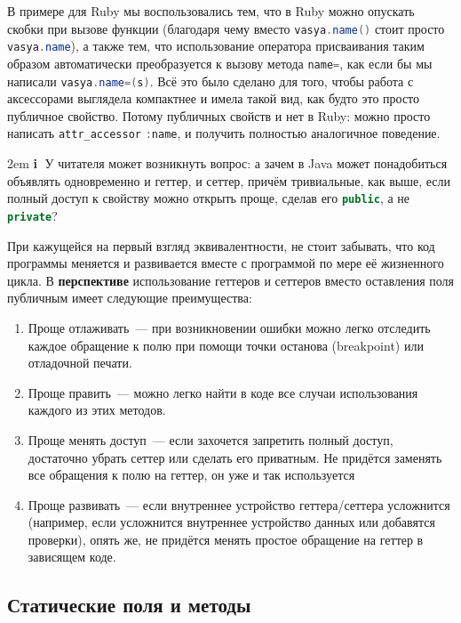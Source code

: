 \documentclass[a4paper, 14pt, titlepage]{extarticle}
\newcommand{\strong}[1]{\textbf{#1}}
\newenvironment{indented}%
    { \begingroup %
        \noindent %
        \leftskip2em %
        \rightskip\leftskip }%
    { \par\endgroup }
\newenvironment{extrainfo}%
    { \begin{indented} %
        \small %
        \textbf{\textcircled{\footnotesize i}} }%
    { \end{indented} }
\newcommand{\inlinecode}[2][Java]{\lstinline[basicstyle=\ttfamily, language=#1]{#2}}
\begin{document}
  В примере для Ruby мы воспользовались тем, что в Ruby можно опускать скобки при вызове функции
  (благодаря чему вместо \inlinecode{vasya.name()} стоит просто \inlinecode{vasya.name}), а также
  тем, что использование оператора присваивания таким образом автоматически преобразуется к вызову
  метода \inlinecode{name=}, как если бы мы написали \inlinecode{vasya.name=(s)}. Всё это было
  сделано для того, чтобы работа с аксессорами выглядела компактнее и имела такой вид, как будто это
  просто публичное свойство. Потому публичных свойств и нет в Ruby: можно просто написать
  \inlinecode{attr_accessor} \mbox{\inlinecode{:name}}, и получить полностью аналогичное поведение.

  \begin{extrainfo}
    У читателя может возникнуть вопрос: а зачем в Java может понадобиться объявлять одновременно и
    геттер, и сеттер, причём тривиальные, как выше, если полный доступ к свойству можно открыть проще,
    сделав его \inlinecode{public}, а не \inlinecode{private}?

    При кажущейся на первый взгляд эквивалентности, не стоит забывать, что код программы меняется и
    развивается вместе с программой по мере её жизненного цикла. В \strong{перспективе}
    использование геттеров и сеттеров вместо оставления поля публичным имеет следующие преимущества:

    \begin{enumerate}
      \item Проще отлаживать~--- при возникновении ошибки можно легко отследить каждое обращение к
            полю при помощи точки останова (breakpoint) или отладочной печати.
      \item Проще править~--- можно легко найти в коде все случаи использования каждого из этих методов.
      \item Проще менять доступ~--- если захочется запретить полный доступ, достаточно убрать сеттер
            или сделать его приватным. Не придётся заменять все обращения к полю на геттер, он уже и
            так используется
      \item Проще развивать~--- если внутреннее устройство геттера/сеттера усложнится (например,
            если усложнится внутреннее устройство данных или добавятся проверки), опять же, не
            придётся менять простое обращение на геттер в зависящем коде.
    \end{enumerate}
  \end{extrainfo}

  \subsection{Статические поля и методы}
\end{document}
